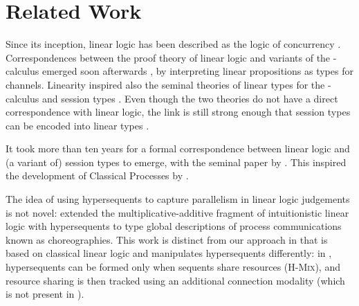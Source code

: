 \documentclass[submission,copyright,creativecommons]{eptcs}
\begin{document}
\section{Related Work}
\label{sec:related-work}

Since its inception, linear logic has been described as the logic of concurrency \citep{girard1987}. Correspondences between the proof theory of linear logic and variants of the \textpi-calculus emerged soon afterwards \citep{abramsky1994,bellin1994}, by interpreting linear propositions as types for channels. Linearity inspired also the seminal theories of linear types for the \textpi-calculus \citep{kobayashi1999} and session types \citep{honda1998}. Even though the two theories do not have a direct correspondence with linear logic, the link is still strong enough that session types can be encoded into linear types \citep{dardha2017}.

It took more than ten years for a formal correspondence between linear logic and (a variant of) session types to emerge, with the seminal paper by \citet{caires2010}. This inspired the development of Classical Processes by \citet{wadler2012}.

The idea of using hypersequents to capture parallelism in linear logic judgements is not novel: \citet{carbone2018} extended the multiplicative-additive fragment of intuitionistic linear logic with hypersequents to type global descriptions of process communications known as choreographies. This work is distinct from our approach in that \hcp is based on classical linear logic and manipulates hypersequents differently: in \citet{carbone2018}, hypersequents can be formed only when sequents share resources (\cf \textsc{H-Mix}), and resource sharing is then tracked using an additional connection modality (which is not present in \hcp).

\clearpage


\end{document}

